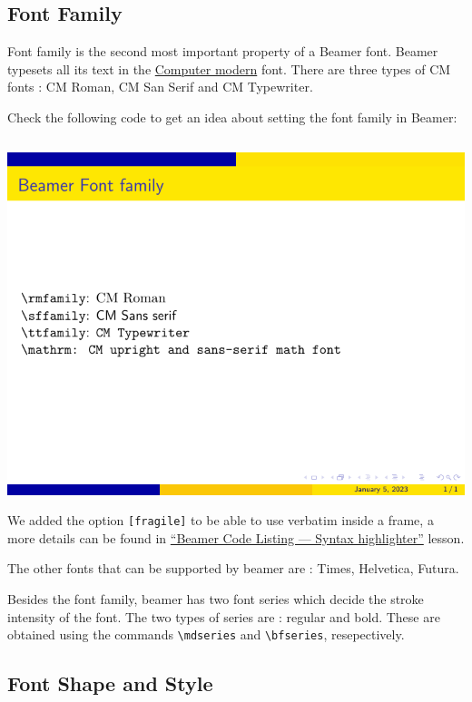 \subsection{Font Family}

Font family is the second most important property of a Beamer font. Beamer typesets all its text in the \href{https://en.wikipedia.org/wiki/Computer_Modern}{Computer modern} font. There are three types of CM fonts : CM Roman, CM San Serif and CM Typewriter.

Check the following code to get an idea about setting the font family in Beamer:

\inputminted[linenos=true]{latex}{examples/beamer/beamerfont03.tex}

\includegraphics{examples/beamer/beamerfont03.pdf}

We added the option \verb|[fragile]| to be able to use verbatim inside a frame, a more details can be found in \href{https://latex-beamer.com/tutorials/beamer-code/}{“Beamer Code Listing — Syntax highlighter”} lesson.

The other fonts that can be supported by beamer are : Times, Helvetica, Futura.

Besides the font family, beamer has two font series which decide the stroke intensity of the font. The two types of series are : regular and bold. These are obtained using the commands \verb|\mdseries| and \verb|\bfseries|, resepectively.

\subsection{Font Shape and Style}

